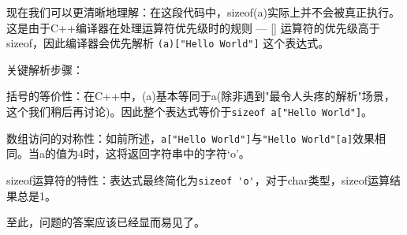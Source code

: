 现在我们可以更清晰地理解：在这段代码中，sizeof(a)实际上并不会被真正执行。这是由于C++编译器在处理运算符优先级时的规则 --- [] 运算符的优先级高于 sizeof，因此编译器会优先解析 \verb|(a)["Hello World"]| 这个表达式。

关键解析步骤：

括号的等价性：在C++中，(a)基本等同于a(除非遇到"最令人头疼的解析"场景，这个我们稍后再讨论)。因此整个表达式等价于\verb|sizeof a["Hello World"]|。

数组访问的对称性：如前所述，\verb|a["Hello World"]|与\verb|"Hello World"[a]|效果相同。当a的值为4时，这将返回字符串中的字符‘o’。

sizeof运算符的特性：表达式最终简化为\verb|sizeof 'o'|，对于char类型，sizeof运算结果总是1。

至此，问题的答案应该已经显而易见了。